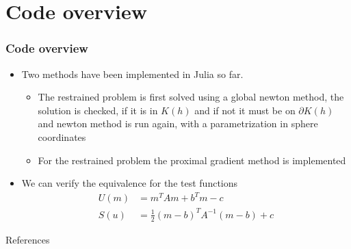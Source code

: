 \documentclass[utf8,aspectratio=169,ngerman,english]{beamer}
\begin{document}
\section{Code overview}
\begin{frame}
 \frametitle{Code overview}
  \begin{itemize}
      \item Two methods have been implemented in Julia so far.
      \begin{itemize}
          \item The restrained problem is first solved using a global newton method, the solution is checked, if it is in $K(h)$ and if not it must be on $\partial K(h)$ and newton method is run again, with a parametrization in sphere coordinates
          \item For the restrained problem the proximal gradient method is implemented
      \end{itemize}
      \item We can verify the equivalence for the test functions 
      \begin{align}
          U(m) &= m^T A m + b^T m - c \\
          S(u) &= \frac{1}{2} (m - b)^T A^{-1} (m-b) + c
      \end{align}
  \end{itemize}
\end{frame}

\begin{frame}[allowframebreaks]{References}
\printbibliography
\end{frame}
\end{document}
